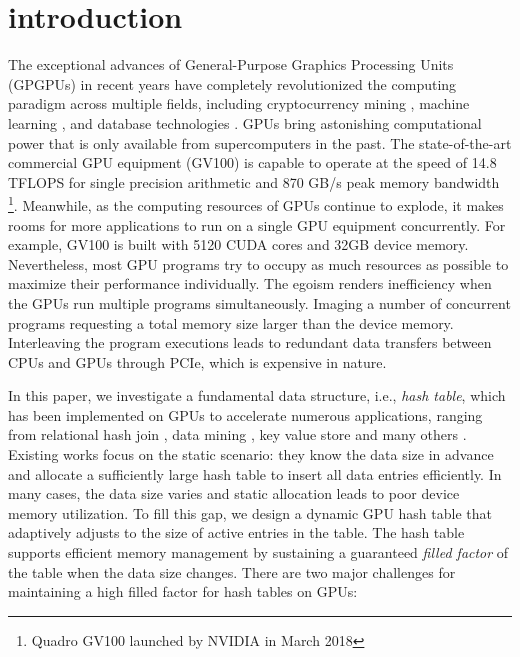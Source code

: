 \section{introduction}
The exceptional advances of General-Purpose Graphics Processing Units (GPGPUs) 
in recent years have completely revolutionized the computing paradigm across multiple fields, including cryptocurrency mining \cite{o2014bitcoin,taylor2013bitcoin}, machine learning \cite{coates2013deep,abadi2016tensorflow}, and database technologies \cite{bakkum2010accelerating,kaldewey2012gpu}.
GPUs bring astonishing computational power that is only available from supercomputers in the past. 
The state-of-the-art commercial GPU equipment (GV100) is capable to operate at the speed of 14.8 TFLOPS for single precision arithmetic and 870 GB/s peak memory bandwidth \footnote{Quadro GV100 launched by NVIDIA in March 2018}. 
Meanwhile, as the computing resources of GPUs continue to explode, it makes rooms for more applications to run on a single GPU equipment concurrently. For example, GV100 is built with 5120 CUDA cores and 32GB device memory. Nevertheless, most GPU programs try to occupy as much resources as possible to maximize their performance individually. 
The egoism renders inefficiency when the GPUs run multiple programs simultaneously. Imaging a number of concurrent programs requesting a total memory size larger than the device memory. Interleaving the program executions leads to redundant data transfers between CPUs and GPUs through PCIe, which is expensive in nature. 

In this paper, we investigate a fundamental data structure, i.e., \emph{hash table}, which has been implemented on GPUs to accelerate numerous applications, ranging from relational hash join \cite{he2008relational,he2009relational,heimel2013hardware}, data mining \cite{pan2011fast,zhou2010parallel,zhong2014medusa},  key value store \cite{zhang2015mega,hetherington2015memcachedgpu,breslow2016horton} and many others \cite{bowers2010parallel,pan2010efficient,garcia2011coherent,niessner2013real,wu2015gpu}. Existing works \cite{alcantara2009real,zhang2015mega,hong2010mapcg,hetherington2015memcachedgpu,breslow2016horton} focus on the static scenario: they know the data size in advance and allocate a sufficiently large hash table to insert all data entries efficiently. In many cases, the data size varies and static allocation leads to poor device memory utilization. To fill this gap, we design a dynamic GPU hash table that adaptively adjusts to the size of active entries in the table. The hash table supports efficient memory management by sustaining a guaranteed \emph{filled factor} of the table when the data size changes. There are two major challenges for maintaining a high filled factor for hash tables on GPUs:

